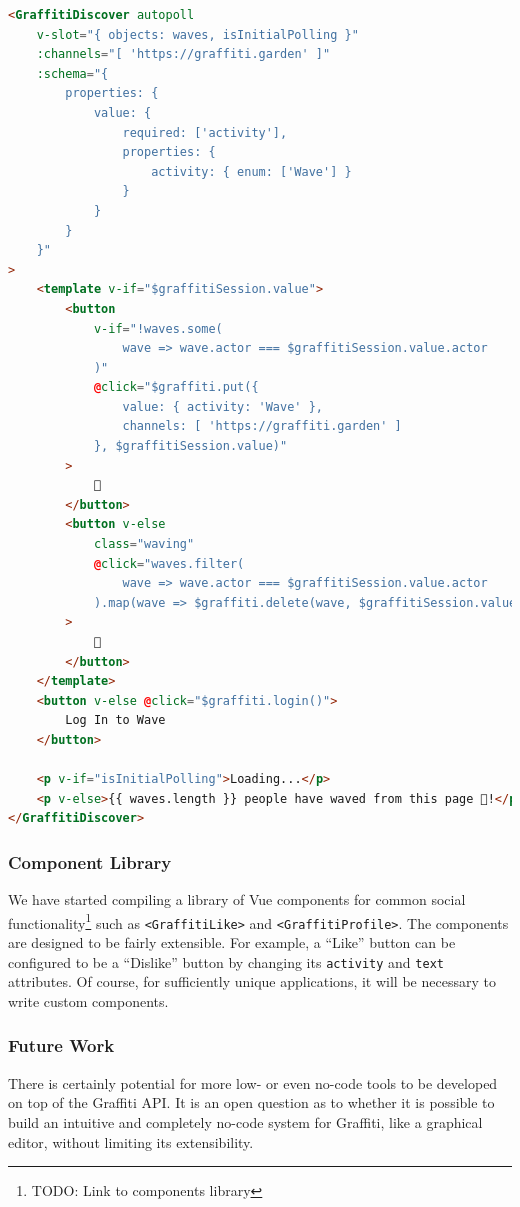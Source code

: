 \begin{lstlisting}[language=html]
<GraffitiDiscover autopoll
    v-slot="{ objects: waves, isInitialPolling }"
    :channels="[ 'https://graffiti.garden' ]"
    :schema="{
        properties: {
            value: {
                required: ['activity'],
                properties: {
                    activity: { enum: ['Wave'] }
                }
            }
        }
    }"
>
    <template v-if="$graffitiSession.value">
        <button
            v-if="!waves.some(
                wave => wave.actor === $graffitiSession.value.actor
            )"
            @click="$graffiti.put({
                value: { activity: 'Wave' },
                channels: [ 'https://graffiti.garden' ]
            }, $graffitiSession.value)"
        >
            👋
        </button>
        <button v-else
            class="waving"
            @click="waves.filter(
                wave => wave.actor === $graffitiSession.value.actor
            ).map(wave => $graffiti.delete(wave, $graffitiSession.value))"
        >
            👋
        </button>
    </template>
    <button v-else @click="$graffiti.login()">
        Log In to Wave
    </button>

    <p v-if="isInitialPolling">Loading...</p>
    <p v-else>{{ waves.length }} people have waved from this page 👋!</p>
</GraffitiDiscover>
\end{lstlisting}

\subsubsection{Component Library}

We have started compiling a library of Vue components
for common social functionality\footnote{
    TODO: Link to components library
}
such as \texttt{<GraffitiLike>} and \texttt{<GraffitiProfile>}.
The components are designed to be fairly extensible.
For example, a ``Like'' button can be configured to be a
``Dislike'' button by changing its \texttt{activity} and
\texttt{text} attributes.
Of course, for sufficiently unique applications, it will be necessary to
write custom components.

\subsubsection{Future Work}

There is certainly potential for more low- or even no-code tools
to be developed on top of the Graffiti API. It is an open
question as to whether it is possible to build an intuitive and completely
no-code system for Graffiti, like a graphical editor, without limiting
its extensibility.

